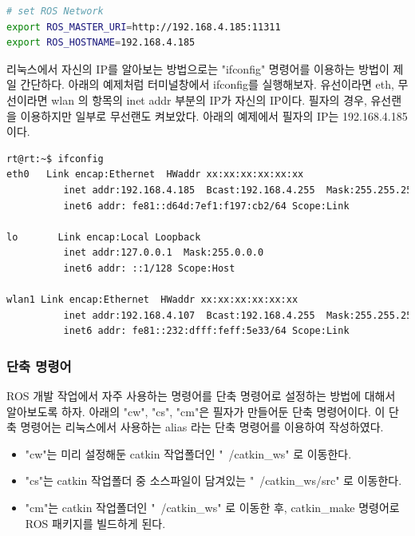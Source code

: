 \begin{lstlisting}[language=bash]
# set ROS Network
export ROS_MASTER_URI=http://192.168.4.185:11311
export ROS_HOSTNAME=192.168.4.185
\end{lstlisting}

\begin{exercise}[ifconfig]
리눅스에서 자신의 IP를 알아보는 방법으로는 "ifconfig" 명령어를 이용하는 방법이 제일 간단하다. 아래의 예제처럼 터미널창에서 ifconfig를 실행해보자. 유선이라면 eth, 무선이라면 wlan 의 항목의 inet addr 부분의 IP가 자신의 IP이다. 필자의 경우, 유선랜을 이용하지만 일부로 무선랜도 켜보았다. 아래의 예제에서 필자의 IP는 192.168.4.185 이다.
\begin{lstlisting}[language=bash, backgroundcolor=\color{ocre!10}, numbers=none]
rt@rt:~$ ifconfig
eth0   Link encap:Ethernet  HWaddr xx:xx:xx:xx:xx:xx  
          inet addr:192.168.4.185  Bcast:192.168.4.255  Mask:255.255.255.0
          inet6 addr: fe81::d64d:7ef1:f197:cb2/64 Scope:Link

lo       Link encap:Local Loopback  
          inet addr:127.0.0.1  Mask:255.0.0.0
          inet6 addr: ::1/128 Scope:Host

wlan1 Link encap:Ethernet  HWaddr xx:xx:xx:xx:xx:xx
          inet addr:192.168.4.107  Bcast:192.168.4.255  Mask:255.255.255.0
          inet6 addr: fe81::232:dfff:feff:5e33/64 Scope:Link
\end{lstlisting}
\end{exercise}

\subsubsection{단축 명령어}
ROS 개발 작업에서 자주 사용하는 명령어를 단축 명령어로 설정하는 방법에 대해서 알아보도록 하자. 아래의 "cw", "cs", "cm"은 필자가 만들어둔 단축 명령어이다. 이 단축 명령어는 리눅스에서 사용하는 alias 라는 단축 명령어를 이용하여 작성하였다. 

\begin{itemize}
\item "cw"는 미리 설정해둔 catkin 작업폴더인 "~/catkin\_ws" 로 이동한다. 
\item "cs"는 catkin 작업폴더 중 소스파일이 담겨있는 "~/catkin\_ws/src" 로 이동한다. 
\item "cm"는 catkin 작업폴더인 "~/catkin\_ws" 로 이동한 후, catkin\_make 명령어로 ROS 패키지를 빌드하게 된다.
\end{itemize}

